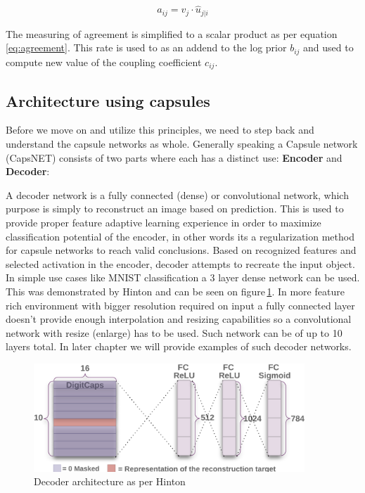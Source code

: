 \begin{equation}
    a_{ij} = v_j \cdot \hat{u}_{j|i}
    \label{eq:agreement}
\end{equation}

The measuring of agreement is simplified to a scalar product as per equation\,\ref{eq:agreement}. This rate is used to as an addend to the log prior $b_{ij}$ and used to compute new value of the coupling coefficient $c_{ij}$.


\subsection{Architecture using capsules}

Before we move on and utilize this principles, we need to step back and understand the capsule networks as whole. Generally speaking a Capsule network (CapsNET) consists of two parts where each has a distinct use: \textbf{Encoder} and \textbf{Decoder}:

A decoder network is a fully connected (dense) or convolutional network, which purpose is simply to reconstruct an image based on prediction. This is used to provide proper feature adaptive learning experience in order to maximize classification potential of the encoder, in other words its a regularization method for capsule networks to reach valid conclusions. Based on recognized features and selected activation in the encoder, decoder attempts to recreate the input object. In simple use cases like MNIST classification a 3 layer dense network can be used. This was demonstrated by Hinton and can be seen on figure\,\ref{fig:decoder}. In more feature rich environment with bigger resolution required on input a fully connected layer doesn't provide enough interpolation and resizing capabilities so a convolutional network with resize (enlarge) has to be used. Such network can be of up to 10 layers total. In later chapter we will provide examples of such decoder networks.

\begin{figure}[ht]
    \centering
    \includegraphics[height=11em]{obrazky-figures/reconsArch.png}
    \caption{Decoder architecture as per Hinton\,\cite{capsule}}
    \label{fig:decoder}
\end{figure}

